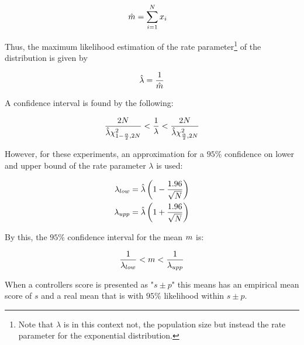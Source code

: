 \begin{align*}
\hat{m} &= \sum_{i=1}^{N} x_i
\end{align*}

Thus, the maximum likelihood estimation of the rate 
parameter\footnote{Note that $\lambda$ is in this context not,
the population size but instead the rate parameter for the
exponential distribution.}
of the distribution is given by

\begin{align*}
\hat{\lambda} = \frac{1}{\hat{m}}
\end{align*}

A confidence interval is found by the following:

\begin{align*}
\frac{2N}{\hat{\lambda}\chi^{2}_{1-\frac{\alpha}{2},2N}}
<
\frac{1}{\lambda}
< 
\frac{2N}{\hat{\lambda}\chi^{2}_{\frac{\alpha}{2},2N}}
\end{align*}

However, for these experiments, an approximation for a $95\%$
confidence on lower and upper bound 
of the rate parameter $\lambda$ is used:

\begin{align*}
\lambda_{low} &= 
\hat{\lambda} \left( 1 - \frac{1.96}{\sqrt{N}} \right)\\
\lambda_{upp} &= 
\hat{\lambda} \left( 1 + \frac{1.96}{\sqrt{N}} \right)
\end{align*}

By this, the $95\%$ confidence interval for the mean $m$ is:

\begin{align*}
\frac{1}{\lambda_{low}} < m < \frac{1}{\lambda_{upp}}
\end{align*}

When a controllers score is presented as "$s \pm p$" this means 
has an empirical mean score of $s$ and a real mean that is with 
$95\%$ likelihood within $s \pm p$. \\

